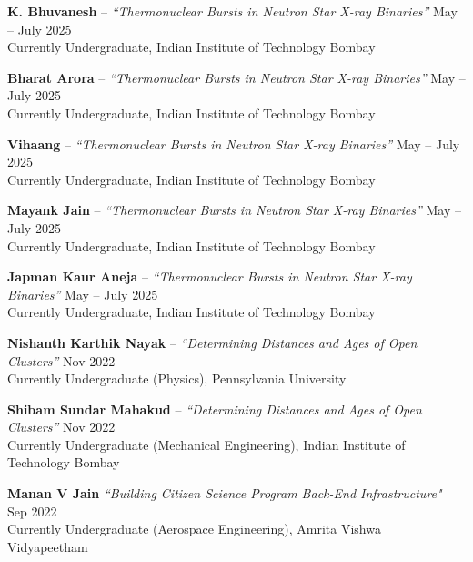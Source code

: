 \textbf{K. Bhuvanesh} -- \textit{“Thermonuclear Bursts in Neutron Star X-ray Binaries”} \hfill May -- July 2025 \\
Currently Undergraduate, Indian Institute of Technology Bombay \\

\vspace{0.5em}

\textbf{Bharat Arora} -- \textit{“Thermonuclear Bursts in Neutron Star X-ray Binaries”} \hfill May -- July 2025 \\
Currently Undergraduate, Indian Institute of Technology Bombay \\

\vspace{0.5em}

\textbf{Vihaang} -- \textit{“Thermonuclear Bursts in Neutron Star X-ray Binaries”} \hfill May -- July 2025 \\
Currently Undergraduate, Indian Institute of Technology Bombay \\

\vspace{0.5em}

\textbf{Mayank Jain} -- \textit{“Thermonuclear Bursts in Neutron Star X-ray Binaries”} \hfill May -- July 2025 \\
Currently Undergraduate, Indian Institute of Technology Bombay \\

\vspace{0.5em}

\textbf{Japman Kaur Aneja} -- \textit{“Thermonuclear Bursts in Neutron Star X-ray Binaries”} \hfill May -- July 2025 \\
Currently Undergraduate, Indian Institute of Technology Bombay \\

\vspace{0.5em}

\textbf{Nishanth Karthik Nayak} --     \textit{“Determining Distances and Ages of Open Clusters”} \hfill Nov 2022 \\
    Currently Undergraduate (Physics), Pennsylvania University \\

\vspace{0.5em}

\textbf{Shibam Sundar Mahakud} -- \textit{“Determining Distances and Ages of Open Clusters”} \hfill Nov 2022 \\
    Currently Undergraduate (Mechanical Engineering), Indian Institute of Technology Bombay \\

\vspace{0.5em}

\textbf{Manan V Jain} \textit{“Building Citizen Science Program Back-End Infrastructure"} \hfill Sep 2022 \\
    Currently Undergraduate (Aerospace Engineering), Amrita Vishwa Vidyapeetham \\